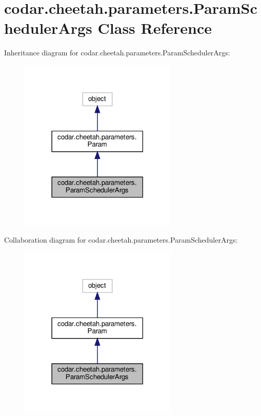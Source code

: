 \hypertarget{classcodar_1_1cheetah_1_1parameters_1_1_param_scheduler_args}{}\section{codar.\+cheetah.\+parameters.\+Param\+Scheduler\+Args Class Reference}
\label{classcodar_1_1cheetah_1_1parameters_1_1_param_scheduler_args}


Inheritance diagram for codar.\+cheetah.\+parameters.\+Param\+Scheduler\+Args\+:
\nopagebreak
\begin{figure}[H]
\begin{center}
\leavevmode
\includegraphics[width=213pt]{classcodar_1_1cheetah_1_1parameters_1_1_param_scheduler_args__inherit__graph}
\end{center}
\end{figure}


Collaboration diagram for codar.\+cheetah.\+parameters.\+Param\+Scheduler\+Args\+:
\nopagebreak
\begin{figure}[H]
\begin{center}
\leavevmode
\includegraphics[width=213pt]{classcodar_1_1cheetah_1_1parameters_1_1_param_scheduler_args__coll__graph}
\end{center}
\end{figure}
